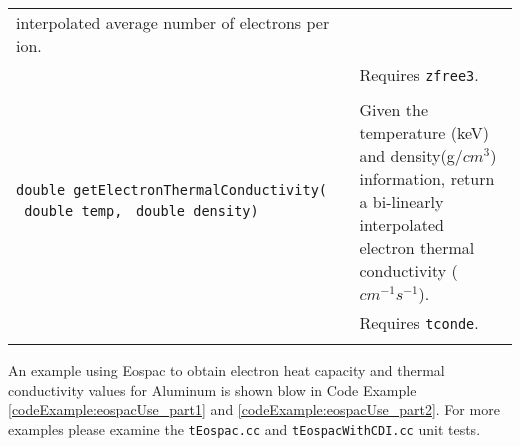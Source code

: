 \documentclass[11pt]{nmemo}
\begin{document}
\begin{table}[H]
\begin{center}
\begin{tabularx}{0.9\linewidth}{YZ}
  interpolated average number of electrons per ion.  \\
&  Requires \texttt{zfree3}. \\
\\
\texttt{double~getElectronThermalConductivity(}
\texttt{\mbox{ double~temp,}} 
\texttt{\mbox{ double~density)}}
& Given the temperature (keV) and density(g/$cm^3$) information, return a bi-linearly
  interpolated electron thermal conductivity ($cm^{-1}s^{-1}$).\\
&  Requires \texttt{tconde}.\\
\\
      \end{tabularx}
    \end{center}
    \normalsize
\end{table}
  

An example using Eospac to obtain electron heat capacity and thermal
conductivity values for Aluminum is shown blow in Code Example~%
\ref{codeExample:eospacUse_part1} and
\ref{codeExample:eospacUse_part2}.  For more examples please examine
the \texttt{tEospac.cc} and \texttt{tEospacWithCDI.cc} unit tests.
\end{document}
